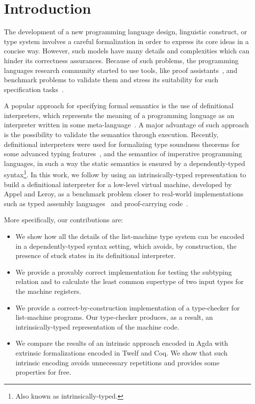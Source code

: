 \documentclass[sigconf]{acmart}
\theoremstyle{definition}
\begin{document}



\section{Introduction}

The development of a new programming language design, linguistic construct,
or type system involves a careful formalization in order to express
its core ideas in a concise way. However, such models have many details
and complexities which can hinder its correctness assurances.
Because of such problems, the programming languages research community
started to use tools, like proof assistants~\cite{Stump16,Chlipala13},
and benchmark problems to validate them and stress its suitability for
such specification tasks~\cite{Aydemir05,Pientka18,Appel07}.

A popular approach for specifying formal semantics is the
use of definitional interpreters, which represents the meaning of a
programming language as an interpreter written in some
meta-language~\cite{Reynolds72}. A major advantage of such approach
is the possibility to validate the semantics through execution.
Recently, definitional interpreters were used for formalizing type
soundness theorems for some advanced typing features~\cite{Amin17},
and the semantics of imperative programming languages, in such a way the static
semantics is ensured by a dependently-typed
syntax\footnote{Also known as intrinsically-typed.}\cite{Poulsen18}.
In this work, we follow \citet{Poulsen18} by using an intrinsically-typed
representation to build a definitional interpreter for a low-level virtual
machine, developed by Appel and Leroy, as a benchmark problem closer to
real-world implementations such as typed assembly languages~\cite{CraryM99} and
proof-carrying code~\cite{Necula97}.

More specifically, our contributions are:

\begin{itemize}
  \item We show how all the details of the list-machine type system
        can be encoded in a dependently-typed syntax setting, which avoids, by construction,
        the presence of stuck states in its definitional interpreter.
  \item We provide a provably correct implementation for testing the subtyping
        relation and to calculate the least common supertype of two input
        types for the machine registers.
  \item We provide a correct-by-construction implementation of a type-checker for
        list-machine programs. Our type-checker produces, as a result, an intrinsically-typed
        representation of the machine code.
  \item We compare the results of an intrinsic approach encoded in Agda with extrinsic
        formalizations encoded in Twelf and Coq. We show that such intrinsic encoding avoids
        unnecessary repetitions and provides some properties for free.
\end{itemize}
\end{document}
